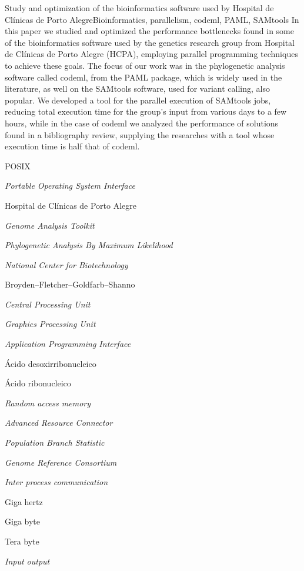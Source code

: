 \documentclass[cic,tc]{iiufrgs}
\begin{document}
\begin{englishabstract}{Study and optimization of the bioinformatics software used by Hospital de Clínicas de Porto Alegre}{Bioinformatics, parallelism, codeml, PAML, SAMtools} In this paper we studied and optimized the performance bottlenecks found in some of the bioinformatics software used by the genetics research group from Hospital de Clínicas de Porto Alegre (HCPA), employing parallel programming techniques to achieve these goals. The focus of our work was in the phylogenetic analysis software called codeml, from the PAML package, which is widely used in the literature, as well on the SAMtools software, used for variant calling, also popular. We developed a tool for the parallel execution of SAMtools jobs, reducing total execution time for the group's input from various days to a few hours, while in the case of codeml we analyzed the performance of solutions found in a bibliography review, supplying the researches with a tool whose execution time is half that of codeml.
\end{englishabstract}

\listoffigures

\listoftables

\begin{listofabbrv}{POSIX}
    \item[POSIX] \textit{Portable Operating System Interface}
    \item[HCPA] Hospital de Clínicas de Porto Alegre
    \item[GATK] \textit{Genome Analysis Toolkit}
    \item[PAML] \textit{Phylogenetic Analysis By Maximum Likelihood}
    \item[NCBI] \textit{National Center for Biotechnology}
    \item[BFGS] Broyden–Fletcher–Goldfarb–Shanno
    \item[CPU] \textit{Central Processing Unit}
    \item[GPU] \textit{Graphics Processing Unit}
    \item[API] \textit{Application Programming Interface}
    \item[DNA] Ácido desoxirribonucleico
    \item[RNA] Ácido ribonucleico
    \item[RAM] \textit{Random access memory}
    \item[ARC] \textit{Advanced Resource Connector}
    \item[PBS] \textit{Population Branch Statistic}
    \item[GRC] \textit{Genome Reference Consortium}
    \item[IPC] \textit{Inter process communication}
    \item[GHz] Giga hertz
    \item[GB] Giga byte
    \item[TB] Tera byte
    \item[IO] \textit{Input output}
\end{listofabbrv}
\end{document}
